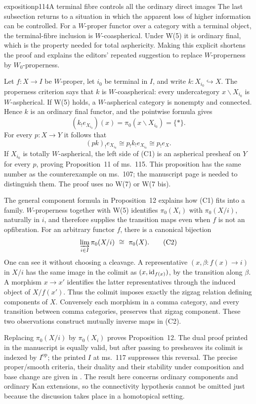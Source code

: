 \begin{dcomment}{exposition}{p114}{A terminal fibre controls all the ordinary direct images}
The last subsection returns to a situation in which the apparent loss of higher information can be controlled. For a $W$-proper functor over a category with a terminal object, the terminal-fibre inclusion is $W$-coaspherical. Under W(5) it is ordinary final, which is the property needed for total asphericity. Making this explicit shortens the proof and explains the editors' repeated suggestion to replace $W$-properness by $W_0$-properness.

Let $f:X\to I$ be $W$-proper, let $i_0$ be terminal in $I$, and write $k:X_{i_0}\hookrightarrow X$. The properness criterion says that $k$ is $W$-coaspherical: every undercategory $x\backslash X_{i_0}$ is $W$-aspherical. If W(5) holds, a $W$-aspherical category is nonempty and connected. Hence $k$ is an ordinary final functor, and the pointwise formula gives
\[
 (k_!e_{X_{i_0}})(x)=\pi_0(x\backslash X_{i_0})=\{*\}.
\]
For every $p:X\to Y$ it follows that
\[
 (pk)_!e_{X_{i_0}}
 \cong p_!k_!e_{X_{i_0}}
 \cong p_!e_X.                                      \tag{C1}
\]
If $X_{i_0}$ is totally $W$-aspherical, the left side of (C1) is an aspherical presheaf on $Y$ for every $p$, proving Proposition~11 of ms.~115. This proposition has the same number as the counterexample on ms.~107; the manuscript page is needed to distinguish them. The proof uses no W(7) or W(7 bis).

The general component formula in Proposition~12 explains how (C1) fits into a family. $W$-properness together with W(5) identifies $\pi_0(X_i)$ with $\pi_0(X/i)$, naturally in $i$, and therefore supplies the transition maps even when $f$ is not an opfibration. For an arbitrary functor $f$, there is a canonical bijection
\[
 \varinjlim_{i\in I}\pi_0(X/i)\ \cong\ \pi_0(X).        \tag{C2}
\]
One can see it without choosing a cleavage. A representative $(x,\beta:f(x)\to i)$ in $X/i$ has the same image in the colimit as $(x,\mathrm{id}_{f(x)})$, by the transition along $\beta$. A morphism $x\to x'$ identifies the latter representatives through the induced object of $X/f(x')$. Thus the colimit imposes exactly the zigzag relation defining components of $X$. Conversely each morphism in a comma category, and every transition between comma categories, preserves that zigzag component. These two observations construct mutually inverse maps in (C2).

Replacing $\pi_0(X/i)$ by $\pi_0(X_i)$ proves Proposition~12. The dual proof printed in the manuscript is equally valid, but after passing to presheaves its colimit is indexed by $I^{\mathrm{op}}$; the printed $I$ at ms.~117 suppresses this reversal. The precise proper/smooth criteria, their duality and their stability under composition and base change are given in \citet[Theorem~1.2 and Proposition~4.7]{Maltsiniotis2005Asphericite}. The result here concerns ordinary components and ordinary Kan extensions, so the connectivity hypothesis cannot be omitted just because the discussion takes place in a homotopical setting.
\end{dcomment}



